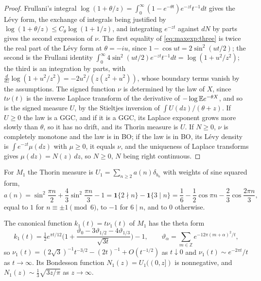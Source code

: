 \begin{proof}
Frullani's integral $\log(1+\theta/z)=\int_0^\infty(1-e^{-\theta t})e^{-zt}t^{-1}dt$ gives the L\'evy form, the exchange of integrals being justified by $\log(1+\theta/z)\le C_\theta\log(1+1/z)$, and integrating $e^{-zt}$ against $dN$ by parts gives the second expression of $\nu$. The first equality of \eqref{eq:maxexp:three} is twice the real part of the L\'evy form at $\theta=-iu$, since $1-\cos ut=2\sin^2(ut/2)$; the second is the Frullani identity $\int_0^\infty4\sin^2(ut/2)e^{-zt}t^{-1}dt=\log(1+u^2/z^2)$; the third is an integration by parts, with $\frac d{dz}\log(1+u^2/z^2)=-2u^2/(z(z^2+u^2))$, whose boundary terms vanish by the assumptions. The signed function $\nu$ is determined by the law of $X$, since $t\nu(t)$ is the inverse Laplace transform of the derivative of $-\log\mathbb{E} e^{-\theta X}$, and so is the signed measure $U$, by the Stieltjes inversion of $\int U(dz)/(\theta+z)$. If $U\ge0$ the law is a GGC, and if it is a GGC, its Laplace exponent grows more slowly than $\theta$, so it has no drift, and its Thorin measure is $U$. If $N\ge0$, $\nu$ is completely monotone and the law is in BO; if the law is in BO, its L\'evy density is $\int e^{-zt}\mu(dz)$ with $\mu\ge0$, it equals $\nu$, and the uniqueness of Laplace transforms gives $\mu(dz)=N(z)\,dz$, so $N\ge0$, $N$ being right continuous.
\end{proof}

For $M_1$ the Thorin measure is $U_1=\sum_{n\ge2}a(n)\delta_{b_n}$ with weights of sine squared form,
\[
a(n)=\sin^2\frac{\pi n}2+\frac43\sin^2\frac{\pi n}3-1=\mathbf 1\{2\nmid n\}-\mathbf 1\{3\mid n\}=\frac16-\frac12\cos\pi n-\frac23\cos\frac{2\pi n}3,
\]
equal to $1$ for $n\equiv\pm1\pmod6$, to $-1$ for $6\mid n$, and to $0$ otherwise.

\begin{proposition}\label{prop:maxexp:levy}
The canonical function $k_1(t)=t\nu_1(t)$ of $M_1$ has the theta form
\[
k_1(t)=\tfrac12e^{\pi t/12}\Big(1+\frac{\vartheta_0-3\vartheta_{1/2}-4\vartheta_{1/3}}{\sqrt{3t}}\Big)-1,\qquad \vartheta_\alpha=\sum_{m\in\mathbb Z}e^{-12\pi(m+\alpha)^2/t},
\]
so $\nu_1(t)=(2\sqrt3)^{-1}t^{-3/2}-(2t)^{-1}+O(t^{-1/2})$ as $t\downarrow0$ and $\nu_1(t)\sim e^{-2\pi t}/t$ as $t\to\infty$. Its Bondesson function $N_1(z)=U_1((0,z])$ is nonnegative, and $N_1(z)\sim\frac13\sqrt{3z/\pi}$ as $z\to\infty$.
\end{proposition}

